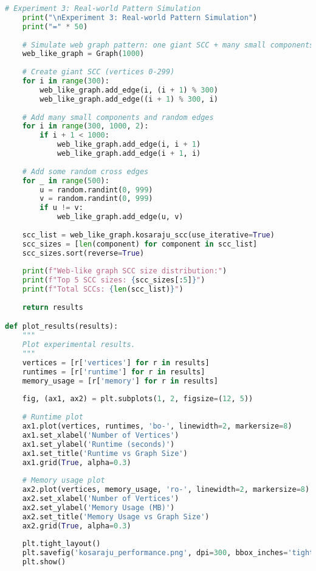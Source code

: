 \documentclass{book}
\theoremstyle{definition}
\begin{document}
\begin{lstlisting}[language=Python, caption=Graph Class Structure]
    # Experiment 3: Real-world Pattern Simulation
    print("\nExperiment 3: Real-world Pattern Simulation")
    print("=" * 50)
    
    # Simulate web graph pattern: one giant SCC + many small components
    web_like_graph = Graph(1000)
    
    # Create giant SCC (vertices 0-299)
    for i in range(300):
        web_like_graph.add_edge(i, (i + 1) % 300)
        web_like_graph.add_edge((i + 1) % 300, i)
    
    # Add many small components and random edges
    for i in range(300, 1000, 2):
        if i + 1 < 1000:
            web_like_graph.add_edge(i, i + 1)
            web_like_graph.add_edge(i + 1, i)
    
    # Add some random cross edges
    for _ in range(500):
        u = random.randint(0, 999)
        v = random.randint(0, 999)
        if u != v:
            web_like_graph.add_edge(u, v)
    
    scc_list = web_like_graph.kosaraju_scc(use_iterative=True)
    scc_sizes = [len(component) for component in scc_list]
    scc_sizes.sort(reverse=True)
    
    print(f"Web-like graph SCC size distribution:")
    print(f"Top 5 SCC sizes: {scc_sizes[:5]}")
    print(f"Total SCCs: {len(scc_list)}")
    
    return results

def plot_results(results):
    """
    Plot experimental results.
    """
    vertices = [r['vertices'] for r in results]
    runtimes = [r['runtime'] for r in results]
    memory_usage = [r['memory'] for r in results]
    
    fig, (ax1, ax2) = plt.subplots(1, 2, figsize=(12, 5))
    
    # Runtime plot
    ax1.plot(vertices, runtimes, 'bo-', linewidth=2, markersize=8)
    ax1.set_xlabel('Number of Vertices')
    ax1.set_ylabel('Runtime (seconds)')
    ax1.set_title('Runtime vs Graph Size')
    ax1.grid(True, alpha=0.3)
    
    # Memory usage plot
    ax2.plot(vertices, memory_usage, 'ro-', linewidth=2, markersize=8)
    ax2.set_xlabel('Number of Vertices')
    ax2.set_ylabel('Memory Usage (MB)')
    ax2.set_title('Memory Usage vs Graph Size')
    ax2.grid(True, alpha=0.3)
    
    plt.tight_layout()
    plt.savefig('kosaraju_performance.png', dpi=300, bbox_inches='tight')
    plt.show()




\end{lstlisting}
\end{document}

